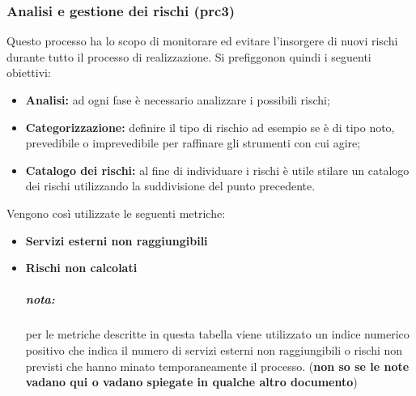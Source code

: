 \subsubsection{Analisi e gestione dei rischi (prc3)}
Questo processo ha lo scopo di monitorare ed evitare l'insorgere di nuovi rischi durante tutto il processo di realizzazione. Si prefiggonon quindi i seguenti obiettivi:
\begin{itemize}
	\item{\textbf{Analisi:} ad ogni fase è necessario analizzare i possibili rischi;}
	\item{\textbf{Categorizzazione:}  definire il tipo di rischio ad esempio se è di tipo noto, prevedibile o imprevedibile per raffinare gli strumenti con cui agire;}
	\item{\textbf{Catalogo dei rischi:} al fine di individuare i rischi è utile stilare un catalogo dei rischi utilizzando la suddivisione del punto precedente.}
\end{itemize}
Vengono così utilizzate le seguenti metriche: 
\begin{itemize}
	\item{\textbf{Servizi esterni non raggiungibili}}
	\item{\textbf{Rischi non calcolati}}
	\subparagraph{nota:} per le metriche descritte in questa tabella viene utilizzato un indice numerico positivo che indica il numero di servizi esterni non raggiungibili o rischi non previsti che hanno minato temporaneamente il processo. (\textbf{non so se le note vadano qui o vadano spiegate in qualche altro documento})
\end{itemize}
\begin{table}[!h]
\end{table}
\newpage
